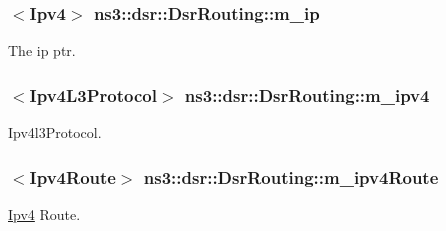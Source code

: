 \subsubsection[{\texorpdfstring{m\+\_\+ip}{m_ip}}]{$<${\bf Ipv4}$>$ ns3\+::dsr\+::\+Dsr\+Routing\+::m\+\_\+ip\hspace{0.3cm}{\ttfamily [private]}}\hypertarget{classns3_1_1dsr_1_1DsrRouting_a0443d48172143cafa1d0491e35f3fbaf}{}\label{classns3_1_1dsr_1_1DsrRouting_a0443d48172143cafa1d0491e35f3fbaf}


The ip ptr. 

\subsubsection[{\texorpdfstring{m\+\_\+ipv4}{m_ipv4}}]{$<${\bf Ipv4\+L3\+Protocol}$>$ ns3\+::dsr\+::\+Dsr\+Routing\+::m\+\_\+ipv4\hspace{0.3cm}{\ttfamily [private]}}\hypertarget{classns3_1_1dsr_1_1DsrRouting_aa42c1b9ee27c8168a2141d3d032006c3}{}\label{classns3_1_1dsr_1_1DsrRouting_aa42c1b9ee27c8168a2141d3d032006c3}


Ipv4l3\+Protocol. 

\subsubsection[{\texorpdfstring{m\+\_\+ipv4\+Route}{m_ipv4Route}}]{$<${\bf Ipv4\+Route}$>$ ns3\+::dsr\+::\+Dsr\+Routing\+::m\+\_\+ipv4\+Route\hspace{0.3cm}{\ttfamily [private]}}\hypertarget{classns3_1_1dsr_1_1DsrRouting_ab4c16d56044159989e52ad33c0afed2b}{}\label{classns3_1_1dsr_1_1DsrRouting_ab4c16d56044159989e52ad33c0afed2b}


\hyperlink{classns3_1_1Ipv4}{Ipv4} Route. 

